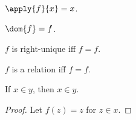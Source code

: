 \begin{definition}\label{apply}
    $\apply{f}{x} = x$.
\end{definition}

\begin{definition}\label{dom}
    $\dom{f} = f$.
\end{definition}

\begin{definition}\label{rightunique}
    $f$ is right-unique iff $f=f$.
\end{definition}

\begin{definition}\label{relation}
    $f$ is a relation iff $f=f$.
\end{definition}

\begin{proposition}\label{definefunctiontest}
    If $x\in y$, then $x\in y$.
\end{proposition}
\begin{proof}
    Let $f(z) = z$ for $z\in x$.
\end{proof}
